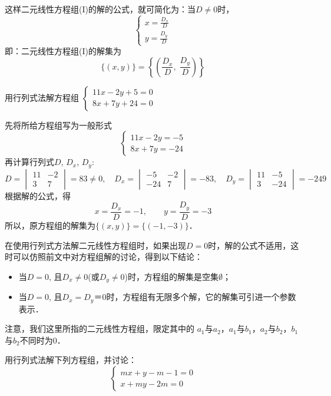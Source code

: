 这样二元线性方程组(I)的解的公式，就可简化为：当$D\ne 0$时，
\[\begin{cases}
    x=\frac{D_x}{D}\\y=\frac{D_y}{D}
\end{cases}\]
即：二元线性方程组(I)的解集为
\[\{(x,y)\}=\left\{\left(\frac{D_x}{D},\; \frac{D_y}{D}\right)\right\}\]

\begin{example}
    用行列式法解方程组
    $\begin{cases}
11x-2y+5=0\\
8x+7y+24=0        
    \end{cases}$
\end{example}

\begin{solution}
    先将所给方程组写为一般形式
\[\begin{cases}
    11x-2y=-5\\
    8x+7y=-24
\end{cases}\]
再计算行列式$D$, $D_x$, $D_y$:
\[D=\begin{vmatrix}
    11&-2\\3&7
\end{vmatrix}=83\ne 0,\quad  D_x=\begin{vmatrix}
    -5&-2\\-24&7
\end{vmatrix}=-83,\quad  D_y=\begin{vmatrix}
    11&-5\\3&-24
\end{vmatrix}=-249\]
根据解的公式，得
\[x=\frac{D_x}{D}=-1,\qquad y=\frac{D_y}{D}=-3\]
所以，原方程组的解集为$\{(x,y)\}=\{(-1,-3)\}$．
\end{solution}

在使用行列式方法解二元线性方程组时，如果出现$D=0$时，解的公式不适用，这时可以仿照前文中对方程组解的讨论，得到以下结论：
\begin{itemize}
    \item 当$D=0$, 且$D_x\ne 0$(或$D_y\ne 0$)时，方程组的解集是空集$\emptyset$；
    \item 当$D=0$, 且$D_x=D_y＝0$时，方程组有无限多个解，它的解集可引进一个参数表示．
\end{itemize}

注意，我们这里所指的二元线性方程组，限定其中的
$a_1$与$a_2$，$a_1$与$b_1$，$a_2$与$b_2$，$b_1$与$b_2$不同时为0．

\begin{example}
    用行列式法解下列方程组，并讨论：
    \[\begin{cases}
        mx+y-m-1=0\\
        x+my-2m=0   
    \end{cases}\]
   \end{example}
   
